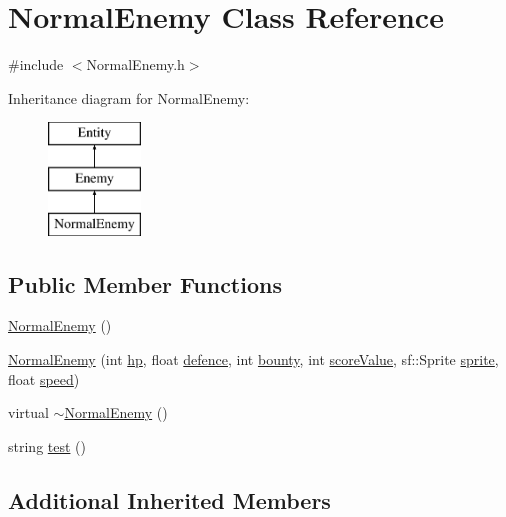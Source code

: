 \hypertarget{class_normal_enemy}{\section{Normal\+Enemy Class Reference}
\label{class_normal_enemy}
}


{\ttfamily \#include $<$Normal\+Enemy.\+h$>$}

Inheritance diagram for Normal\+Enemy\+:\begin{figure}[H]
\begin{center}
\leavevmode
\includegraphics[height=3.000000cm]{class_normal_enemy}
\end{center}
\end{figure}
\subsection*{Public Member Functions}
\begin{DoxyCompactItemize}
\item 
\hyperlink{class_normal_enemy_aa386eea59a2983574fe7d55a91f93012}{Normal\+Enemy} ()
\item 
\hyperlink{class_normal_enemy_a078afb2bd89fb1036da05f604486a070}{Normal\+Enemy} (int \hyperlink{class_enemy_a278d70100af07c946743db1b7a1a9f59}{hp}, float \hyperlink{class_enemy_a9bb5d74024760e604c41ba79cc7da892}{defence}, int \hyperlink{class_enemy_a1d9a86d110b87f3cc55b40d1bdb59eb5}{bounty}, int \hyperlink{class_enemy_abc49d5a2cef917c8ece8a16547f8efee}{score\+Value}, sf\+::\+Sprite \hyperlink{class_entity_a48ef4ab143b8d0211877c9f6be42e824}{sprite}, float \hyperlink{class_entity_a1de3d8d9ab8088f61e6726069b26fa60}{speed})
\item 
virtual \hyperlink{class_normal_enemy_ab754d5476253062793eb7af3601785b6}{$\sim$\+Normal\+Enemy} ()
\item 
string \hyperlink{class_normal_enemy_a3409e903bc18e9ab9d58d8181ec6658f}{test} ()
\end{DoxyCompactItemize}
\subsection*{Additional Inherited Members}


